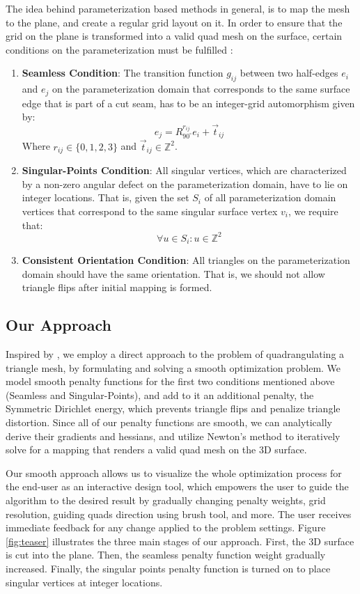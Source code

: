\noindent The idea behind parameterization based methods in general, is to map the mesh to the plane, and create a regular grid layout on it. In order to ensure that the grid on the plane is transformed into a valid quad mesh on the surface, certain conditions on the parameterization must be fulfilled \cite{bommes:hal-00862648}:

\begin{enumerate}
  \item \textbf{Seamless Condition}: The transition function $g_{ij}$ between two half-edges $e_i$ and $e_j$ on the parameterization domain that corresponds to the same surface edge that is part of a cut seam, has to be an integer-grid automorphism given by:
  $$e_j = R^{r_{ij}}_{90^\circ}e_i + \vec{t}_{ij}$$
  Where  $r_{ij} \in \{0,1,2,3\}$ and $\vec{t}_{ij} \in \mathbb{Z}^2$.
  
  \item \textbf{Singular-Points Condition}: All singular vertices, which are characterized by a non-zero angular defect on the parameterization domain, have to lie on integer locations. That is, given the set $S_i$ of all parameterization domain vertices that correspond to the same singular surface vertex $v_i$, we require that:
  $$\forall u \in S_i: u \in \mathbb{Z}^2 $$
  
  \item \textbf{Consistent Orientation Condition}: All triangles on the parameterization domain should have the same orientation. That is, we should not allow triangle flips after initial mapping is formed.
\end{enumerate}

\subsection*{Our Approach}
Inspired by \cite{Poranne:Autocuts:2017}, we employ a direct approach to the problem of quadrangulating a triangle mesh, by formulating and solving a smooth optimization problem. We model smooth penalty functions for the first two conditions mentioned above (Seamless and Singular-Points), and add to it an additional penalty, the Symmetric Dirichlet energy, which prevents triangle flips and penalize triangle distortion.
Since all of our penalty functions are smooth, we can analytically derive their gradients and hessians, and utilize Newton's method to iteratively solve for a mapping that renders a valid quad mesh on the 3D surface.

\noindent Our smooth approach allows us to visualize the whole optimization process for the end-user as an interactive design tool, which empowers the user to guide the algorithm to the desired result by gradually changing penalty weights, grid resolution, guiding quads direction using brush tool, and more. The user receives immediate feedback for any change applied to the problem settings. Figure \ref{fig:teaser} illustrates the three main stages of our approach. First, the 3D surface is cut into the plane. Then, the seamless penalty function weight gradually increased. Finally, the singular points penalty function is turned on to place singular vertices at integer locations.

